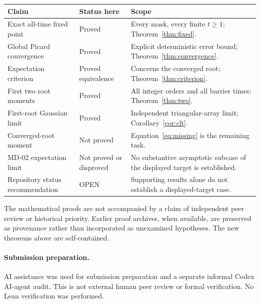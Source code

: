 \documentclass[11pt]{article}
\theoremstyle{remark}\newtheorem{remark}[theorem]{Remark}
\begin{document}
\begin{longtable}{p{}p{}p{}}
\toprule
Claim & Status here & Scope\\\midrule
Exact all-time fixed point & Proved & Every mask, every finite $t\ge1$; Theorem~\ref{thm:fixed}.\\
Global Picard convergence & Proved & Explicit deterministic error bound; Theorem~\ref{thm:convergence}.\\
Expectation criterion & Proved equivalence & Concerns the converged root; Theorem~\ref{thm:criterion}.\\
First two root moments & Proved & All integer orders and all barrier times; Theorem~\ref{thm:two}.\\
First-root Gaussian limit & Proved & Independent triangular-array limit; Corollary~\ref{cor:clt}.\\
Converged-root moment & Not proved & Equation~\eqref{eq:missing} is the remaining task.\\
MD-02 expectation limit & Not proved or disproved & No substantive asymptotic subcase of the displayed target is established.\\
Repository status recommendation & OPEN & Supporting results alone do not establish a displayed-target case.\\
\bottomrule
\end{longtable}

The mathematical proofs are not accompanied by a claim of independent peer
review or historical priority. Earlier proof archives, when available, are
preserved as provenance rather than incorporated as unexamined hypotheses.
The new theorems above are self-contained.

\paragraph{Submission preparation.} AI assistance was used for submission preparation and a separate informal Codex AI-agent audit. This is not external human peer review or formal verification. No Lean verification was performed.
\end{document}
